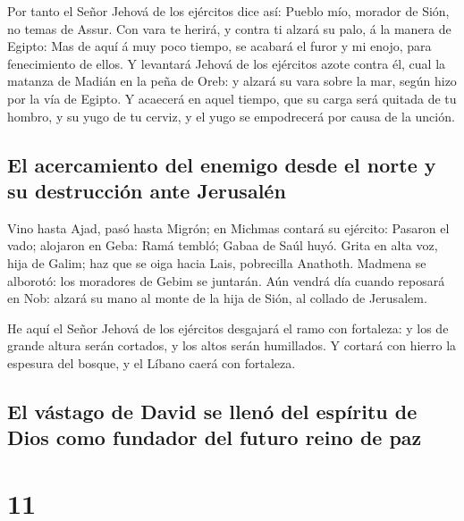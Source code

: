  Por tanto el Señor Jehová de los ejércitos dice así:
Pueblo mío, morador de Sión, no temas de Assur. Con vara te herirá, y
contra ti alzará su palo, á la manera de Egipto:  Mas de
aquí á muy poco tiempo, se acabará el furor y mi enojo, para
fenecimiento de ellos.  Y levantará Jehová de los ejércitos
azote contra él, cual la matanza de Madián en la peña de Oreb: y alzará
su vara sobre la mar, según hizo por la vía de Egipto.  Y
acaecerá en aquel tiempo, que su carga será quitada de tu hombro, y su
yugo de tu cerviz, y el yugo se empodrecerá por causa de la unción.

\hypertarget{el-acercamiento-del-enemigo-desde-el-norte-y-su-destrucciuxf3n-ante-jerusaluxe9n}{%
\subsection{El acercamiento del enemigo desde el norte y su destrucción
ante
Jerusalén}\label{el-acercamiento-del-enemigo-desde-el-norte-y-su-destrucciuxf3n-ante-jerusaluxe9n}}

 Vino hasta Ajad, pasó hasta Migrón; en Michmas contará su
ejército:  Pasaron el vado; alojaron en Geba: Ramá tembló;
Gabaa de Saúl huyó.  Grita en alta voz, hija de Galim; haz
que se oiga hacia Lais, pobrecilla Anathoth.  Madmena se
alborotó: los moradores de Gebim se juntarán.  Aún vendrá
día cuando reposará en Nob: alzará su mano al monte de la hija de Sión,
al collado de Jerusalem.

 He aquí el Señor Jehová de los ejércitos desgajará el ramo
con fortaleza: y los de grande altura serán cortados, y los altos serán
humillados.  Y cortará con hierro la espesura del bosque, y
el Líbano caerá con fortaleza.

\hypertarget{el-vuxe1stago-de-david-se-llenuxf3-del-espuxedritu-de-dios-como-fundador-del-futuro-reino-de-paz}{%
\subsection{El vástago de David se llenó del espíritu de Dios como
fundador del futuro reino de
paz}\label{el-vuxe1stago-de-david-se-llenuxf3-del-espuxedritu-de-dios-como-fundador-del-futuro-reino-de-paz}}

\hypertarget{section-10}{%
\section{11}\label{section-10}}

